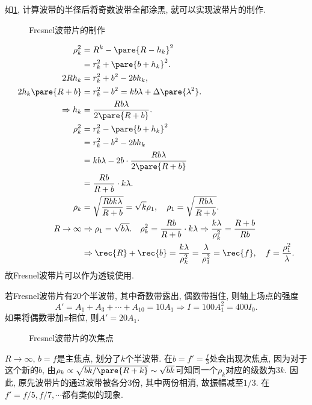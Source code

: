 \documentclass{ctexart}
\begin{document}
如\cref{fig:Fresnel波带片的制作}, 计算波带的半径后将奇数波带全部涂黑, 就可以实现波带片的制作.
\begin{figure}[ht]
    \centering
    \caption{Fresnel波带片的制作}
    \label{fig:Fresnel波带片的制作}
\end{figure}
\begin{align*}
    \rho_k^2 &= R^k - \pare{R-h_k}^2 \\
    &= r_k^2 + \pare{b+h_k}^2. \\
    2Rh_k &= r_k^2 + b^2 - 2bh_k, \\
    2h_k\pare{R+b} &= r_k^2 - b^2 = kb\lambda + \Delta\pare{\lambda^2}. \\
    \Rightarrow h_k &= \frac{Rb\lambda}{2\pare{R+b}}. \\
    \rho_k^2 &= r_k^2 - \pare{b+h_k}^2 \\
    &= r_k^2 - b^2 - 2bh_k \\
    &= kb\lambda - 2b\cdot \frac{Rb\lambda}{2\pare{R+b}} \\
    &= \frac{Rb}{R+b}\cdot k\lambda. \\
    \rho_k &= \sqrt{\frac{Rbk\lambda}{R+b}} = \sqrt{k}\rho_1,\quad \rho_1 = \sqrt{\frac{Rb\lambda}{R+b}}. \\
    R\rightarrow \infty &\Rightarrow \rho_1 = \sqrt{b\lambda}. \quad
    \rho_k^2 = \frac{Rb}{R+b}\cdot k\lambda \Rightarrow \frac{k\lambda}{\rho_k^2} = \frac{R+b}{Rb}\\ & \Rightarrow \rec{R} + \rec{b} = \frac{k\lambda}{\rho_k^2} = \frac{\lambda}{\rho_1^2} = \rec{f},\quad f = \frac{\rho_1^2}{\lambda}.
\end{align*}
故Fresnel波带片可以作为透镜使用.
\begin{sample}
    \begin{ex}
        若Fresnel波带片有$20$个半波带, 其中奇数带露出, 偶数带挡住, 则轴上场点的强度
        \[ A' = A_1 + A_3 + \cdots + A_{10} = 10A_1\Rightarrow I = 100A_1^2 = 400 I_0. \]
        如果将偶数带加$\pi$相位, 则$A' = 20A_1$.
    \end{ex}
\end{sample}
\begin{figure}
    \centering
    \caption{Fresnel波带片的次焦点}
\end{figure}
$R\rightarrow\infty$, $b=f$是主焦点, 划分了$k$个半波带. 在$\displaystyle b = f' = \frac{f}{3}$处会出现次焦点, 因为对于这个新的$b$, 由$\rho_k \propto \sqrt{bk/\pare{R+k}}\sim\sqrt{bk}$可知同一个$\rho_k$对应的级数为$3k$. 因此, 原先波带片的通过波带被各分$3$份, 其中两份相消, 故振幅减至$1/3$. 在$f' = f/5, f/7, \cdots$都有类似的现象.
\end{document}
